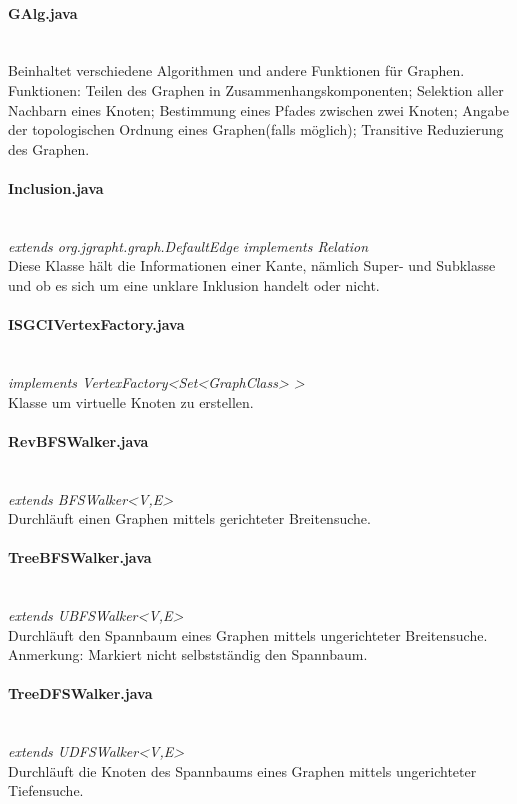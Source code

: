 \documentclass[10pt,a4paper]{article}
\begin{document}
\paragraph{GAlg.java}\ \\
Beinhaltet verschiedene Algorithmen und andere Funktionen für Graphen.\\
Funktionen: Teilen des Graphen in Zusammenhangskomponenten; Selektion aller Nachbarn eines Knoten; Bestimmung eines Pfades zwischen zwei Knoten; Angabe der topologischen Ordnung eines Graphen(falls möglich); Transitive Reduzierung des Graphen.\\

\paragraph{Inclusion.java}\ \\
\emph{extends org.jgrapht.graph.DefaultEdge
        implements Relation}\\
Diese Klasse hält die Informationen einer Kante, nämlich Super- und Subklasse und ob es sich um eine unklare Inklusion handelt oder nicht.\\
\paragraph{ISGCIVertexFactory.java}\ \\
\emph{ implements VertexFactory<Set<GraphClass> >}\\
Klasse um virtuelle Knoten zu erstellen.\\
\paragraph{RevBFSWalker.java}\ \\
\emph{extends BFSWalker<V,E>}\\
Durchläuft einen Graphen mittels gerichteter Breitensuche.\
\paragraph{TreeBFSWalker.java}\ \\
\emph{ extends UBFSWalker<V,E>}\\
Durchläuft den Spannbaum eines Graphen mittels ungerichteter Breitensuche. Anmerkung: Markiert nicht selbstständig den Spannbaum.\\
\paragraph{TreeDFSWalker.java}\ \\
\emph{extends UDFSWalker<V,E>}\\
Durchläuft die Knoten des Spannbaums eines Graphen mittels ungerichteter Tiefensuche.\\
\end{document}
